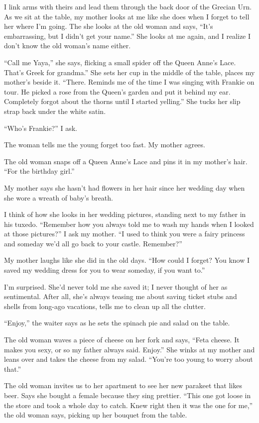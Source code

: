 \documentclass[
]{article}
\begin{document}
I link arms with theirs and lead them through the back door of the
Grecian Urn. As we sit at the table, my mother looks at me like she does
when I forget to tell her where I'm going. The she looks at the old
woman and says, ``It's embarrassing, but I didn't get your name.'' She
looks at me again, and I realize I don't know the old woman's name
either.

``Call me Yaya,'' she says, flicking a small spider off the Queen Anne's
Lace. That's Greek for grandma.'' She sets her cup in the middle of the
table, places my mother's beside it. ``There. Reminds me of the time I
was singing with Frankie on tour. He picked a rose from the Queen's
garden and put it behind my ear. Completely forgot about the thorns
until I started yelling.'' She tucks her slip strap back under the white
satin.

``Who's Frankie?'' I ask.

The woman tells me the young forget too fast. My mother agrees.

The old woman snaps off a Queen Anne's Lace and pins it in my mother's
hair. ``For the birthday girl.''

My mother says she hasn't had flowers in her hair since her wedding day
when she wore a wreath of baby's breath.

I think of how she looks in her wedding pictures, standing next to my
father in his tuxedo. ``Remember how you always told me to wash my hands
when I looked at those pictures?'' I ask my mother. ``I used to think
you were a fairy princess and someday we'd all go back to your castle.
Remember?''

My mother laughs like she did in the old days. ``How could I forget? You
know I saved my wedding dress for you to wear someday, if you want to.''

I'm surprised. She'd never told me she saved it; I never thought of her
as sentimental. After all, she's always teasing me about saving ticket
stubs and shells from long-ago vacations, tells me to clean up all the
clutter.

``Enjoy,'' the waiter says as he sets the spinach pie and salad on the
table.

The old woman waves a piece of cheese on her fork and says, ``Feta
cheese. It makes you sexy, or so my father always said. Enjoy.'' She
winks at my mother and leans over and takes the cheese from my salad.
``You're too young to worry about that.''

The old woman invites us to her apartment to see her new parakeet that
likes beer. Says she bought a female because they sing prettier. ``This
one got loose in the store and took a whole day to catch. Knew right
then it was the one for me,'' the old woman says, picking up her bouquet
from the table.
\end{document}
